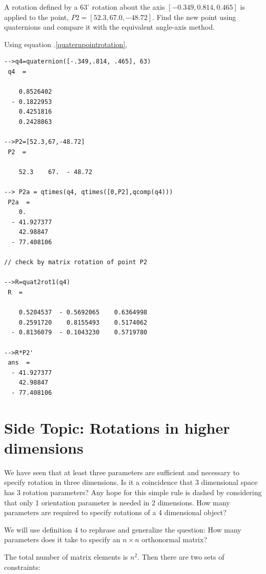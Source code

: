 \begin{ExampleSmall}
A rotation defined by a $63^\circ$ rotation about the axis $[-0.349, 0.814, 0.465]$ is applied to the point,
$P2 = [52.3, 67.0, -48.72]$.   Find the new point using quaternions and compare it with the equivalent angle-axis method.

\vspace{0.2in}

Using equation \thechapter.\ref{quaternpointrotation},
\begin{verbatim}
-->q4=quaternion([-.349,.814, .465], 63)
 q4  =

    0.8526402
  - 0.1822953
    0.4251816
    0.2428863

-->P2=[52.3,67,-48.72]
 P2  =

    52.3    67.  - 48.72

--> P2a = qtimes(q4, qtimes([0,P2],qcomp(q4)))
 P2a  =
    0.
  - 41.927377
    42.98847
  - 77.408106

// check by matrix rotation of point P2

-->R=quat2rot1(q4)
 R  =

    0.5204537  - 0.5692065    0.6364998
    0.2591720    0.8155493    0.5174062
  - 0.8136079  - 0.1043230    0.5719780

-->R*P2'
 ans  =
  - 41.927377
    42.98847
  - 77.408106

\end{verbatim}
\end{ExampleSmall}









\section{Side Topic:  Rotations in higher dimensions}
We have seen that at least three parameters are sufficient and necessary to specify rotation in three dimensions.   Is it a coincidence that 3 dimensional space has 3 rotation parameters?    Any hope for this simple rule is dashed by considering that only 1 orientation parameter is needed in 2 dimensions.   How many parameters are required to specify rotations of a 4 dimensional object?

We will use definition 4 to rephrase and generalize the question:  How many parameters does it take to specify an $n\times n$ orthonormal matrix?

The total number of matrix elements is $n^2$.   Then there are two sets of constraints:

